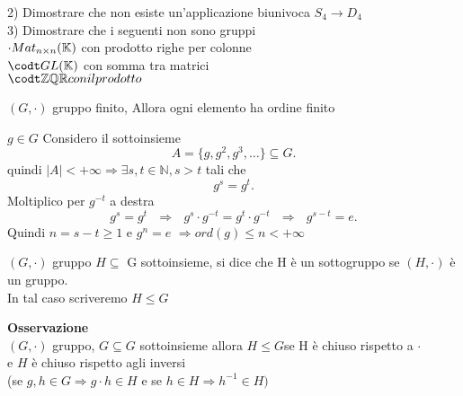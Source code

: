 \documentclass[12px]{article}
\begin{document}
2) Dimostrare che non esiste un'applicazione biunivoca $S_4 \rightarrow D_4$\\
3) Dimostrare che i seguenti non sono gruppi\\
$\cdot Mat_{n\times n} (\mathbb{K})$ con prodotto righe per colonne\\
 $\codt GL(\K)$ con somma tra matrici\\
 $\codt \mathbb Z \mathbb Q \R con il prodotto$\\
  \begin{prop}
	  $(G, \cdot)$ gruppo finito, Allora ogni elemento ha ordine finito
 \end{prop}
 \begin{dimo}
 	$g\in G$ Considero il sottoinsieme
	 \[
	A = \lbrace g, g^2, g^3, \ldots\rbrace\subseteq G
	.\] 
	quindi $|A|<+\infty \Rightarrow \exists s,t\in \mathbb N, s> t$  tali che \[
	g^s = g^t
	.\] 
	Moltiplico per $g^{-t}$ a destra
	\[
		g^s = g^t \ \ \ \Rightarrow  \ \ \ g^s\cdot g^{-t} = g^t\cdot g^{-t} \ \ \ \Rightarrow \ \ \ g^{s-t} = e
	.\] 
	Quindi $n = s-t\geq 1$ e $g^n = e $ $ \Rightarrow ord(g) \leq n < +\infty $
 \end{dimo}
 \begin{defi}[Sottogruppo]
 	$(G, \cdot)$ gruppo $H\subseteq$ G sottoinsieme, si dice che H è un sottogruppo se $(H,\cdot)$ è un gruppo.\\
	In tal caso scriveremo $H \leq G$
 \end{defi}
 \textbf{Osservazione}\\
 $(G,\cdot)$ gruppo,  $G\subseteq G$ sottoinsieme allora  $H\leq G$se H è chiuso rispetto a $\cdot$ \\e  $H$ è chiuso rispetto agli inversi \\(se  $g, h\in G \Rightarrow g\cdot h\in H$ e se $h\in H \Rightarrow h^{-1}\in H)$
\end{document}
